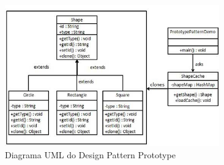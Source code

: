 \begin{figure}[H]
	\centering
	\includegraphics[width = 350px]{figuras/prototype_pattern_uml_diagram}
	\caption {Diagrama UML do Design Pattern Prototype}
	\label{fig:dp_prototype}
\end{figure}



